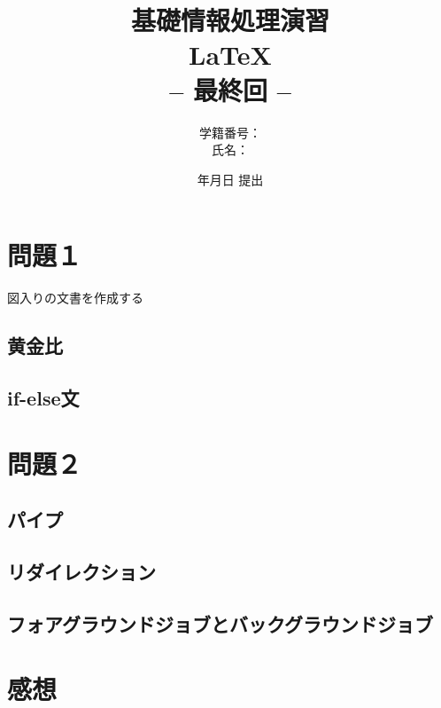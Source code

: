 \documentclass[titlepage]{jarticle}
\begin{document}

\title{基礎情報処理演習\\ \LaTeX\\ -- 最終回 --}
\author{学籍番号：\\
氏名：}
\date{年月日 提出}

\maketitle

\section{問題１}
図入りの文書を作成する

\subsection{黄金比}

\subsection{if-else文}

\newpage
\section{問題２}
\subsection{パイプ}

\subsection{リダイレクション}

\subsection{フォアグラウンドジョブとバックグラウンドジョブ}

\section{感想}
\end{document}
